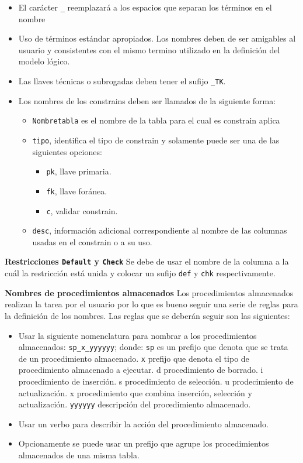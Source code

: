 \begin{itemize}
\item El carácter \texttt{_} reemplazará a los espacios que separan los términos en el nombre
\item Uso de términos estándar apropiados. Los nombres deben de ser amigables al usuario y consistentes con el mismo termino utilizado en la definición del modelo lógico.
\item Las llaves técnicas o subrogadas deben tener el sufijo \texttt{_TK}.
\item Los nombres de los constrains deben ser llamados de la siguiente forma:
\begin{itemize}
\item \texttt{Nombretabla} es el nombre de la tabla para el cual es constrain aplica
\item \texttt{tipo}, identifica el tipo de constrain y solamente puede ser una de las siguientes opciones:
\begin{itemize}
\item \texttt{pk}, llave primaria.
\item \texttt{fk}, llave foránea.
\item \texttt{c}, validar constrain.
\end{itemize}
\item \texttt{desc}, información adicional correspondiente al nombre de las columnas usadas en el constrain o a su uso. 
\end{itemize}
\end{itemize}

\textbf{Restricciones \texttt{Default} y \texttt{Check}}
Se debe de usar el nombre de la columna a la cuál la restricción está unida y colocar un sufijo \texttt{def} y \texttt{chk} respectivamente.

\textbf{Nombres de procedimientos almacenados}
Los procedimientos almacenados realizan la tarea por el usuario por lo que es bueno seguir una serie de reglas para la definición de los nombres. Las reglas que se deberán seguir son las siguientes:

\begin{itemize}
\item Usar la siguiente nomenclatura para nombrar a los procedimientos almacenados: \texttt{sp_x_yyyyyy}; donde:
\texttt{sp}    es un prefijo que denota que se trata de un procedimiento almacenado.
\texttt{x}     prefijo que denota el tipo de procedimiento almacenado a ejecutar.
d   procedimiento de borrado.
i   procedimiento de inserción.
s   procedimiento de selección.
u   prodecimiento de actualización.
x   procedimiento que combina inserción, selección y actualización.
\texttt{yyyyyy}   descripción del procedimiento almacenado.
\item Usar un verbo para describir la acción del procedimiento almacenado.
\item Opcionamente se puede usar un prefijo que agrupe los procedimientos almacenados de una misma tabla.
\end{itemize}

